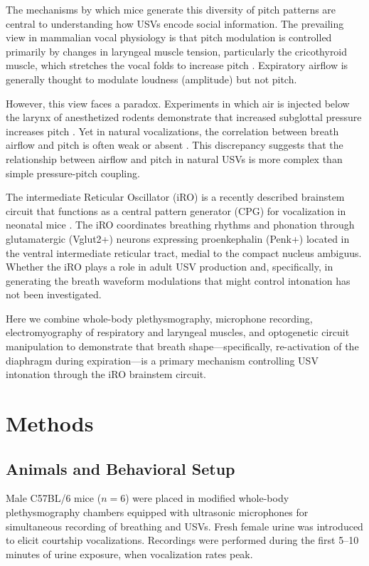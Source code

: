 \documentclass[11pt]{article}
\begin{document}
The mechanisms by which mice generate this diversity of pitch patterns are central to understanding how USVs encode social information. The prevailing view in mammalian vocal physiology is that pitch modulation is controlled primarily by changes in laryngeal muscle tension, particularly the cricothyroid muscle, which stretches the vocal folds to increase pitch \citep{titze1994,riede2011}. Expiratory airflow is generally thought to modulate loudness (amplitude) but not pitch.

However, this view faces a paradox. Experiments in which air is injected below the larynx of anesthetized rodents demonstrate that increased subglottal pressure increases pitch \citep{riede2013}. Yet in natural vocalizations, the correlation between breath airflow and pitch is often weak or absent \citep{sirotin2014}. This discrepancy suggests that the relationship between airflow and pitch in natural USVs is more complex than simple pressure-pitch coupling.

The intermediate Reticular Oscillator (iRO) is a recently described brainstem circuit that functions as a central pattern generator (CPG) for vocalization in neonatal mice \citep{wei2022}. The iRO coordinates breathing rhythms and phonation through glutamatergic (Vglut2+) neurons expressing proenkephalin (Penk+) located in the ventral intermediate reticular tract, medial to the compact nucleus ambiguus. Whether the iRO plays a role in adult USV production and, specifically, in generating the breath waveform modulations that might control intonation has not been investigated.

Here we combine whole-body plethysmography, microphone recording, electromyography of respiratory and laryngeal muscles, and optogenetic circuit manipulation to demonstrate that breath shape---specifically, re-activation of the diaphragm during expiration---is a primary mechanism controlling USV intonation through the iRO brainstem circuit.

\section{Methods}

\subsection{Animals and Behavioral Setup}

Male C57BL/6 mice ($n = 6$) were placed in modified whole-body plethysmography chambers equipped with ultrasonic microphones for simultaneous recording of breathing and USVs. Fresh female urine was introduced to elicit courtship vocalizations. Recordings were performed during the first 5--10 minutes of urine exposure, when vocalization rates peak.
\end{document}
